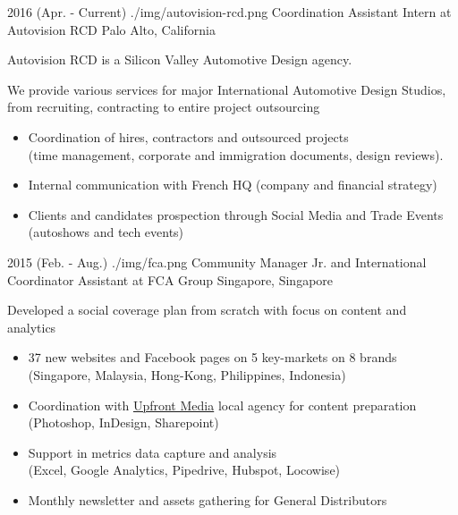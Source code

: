 \documentclass[]{cv}
\begin{document}
\begin{entrylistlogodated}

\entrylogodated
       {2016 \scriptsize{(Apr. - Current)}}
       {./img/autovision-rcd.png}
       {Coordination Assistant Intern at Autovision RCD}
       {Palo Alto, California}
       {
         Autovision RCD is a Silicon Valley Automotive Design agency.

         We provide various services for major International
         Automotive Design Studios, from recruiting, contracting to
         entire project outsourcing

         \begin{itemize}
         \item Coordination of hires, contractors and outsourced
           projects\\ 
           (time management, corporate and immigration documents,
           design reviews).
         \item Internal communication with French HQ (company and
           financial strategy)
         \item Clients and candidates prospection through Social Media
           and Trade Events (autoshows and tech events)
         \end{itemize}
       }
\end{entrylistlogodated}

\begin{entrylistlogodated}
\entrylogodated
       {2015 \scriptsize{(Feb. - Aug.)}}
       {./img/fca.png}
       {Community Manager Jr. and International Coordinator Assistant at FCA Group}
       {Singapore, Singapore}
       {
         Developed a social coverage plan from scratch with focus on content and analytics
         \begin{itemize}
         \item 37 new websites and Facebook pages on 5 key-markets on 8 brands\\
           (Singapore, Malaysia, Hong-Kong, Philippines, Indonesia)
        \item Coordination with \href{http://upfront-asia.upfrontmedia.asia}{Upfront Media} local agency for content preparation\\
          (Photoshop, InDesign, Sharepoint)
         \item Support in metrics data capture and analysis\\
           (Excel, Google Analytics, Pipedrive, Hubspot, Locowise)
         \item Monthly newsletter and assets gathering for General Distributors
         \end{itemize}
       }
\end{entrylistlogodated}
\end{document}
